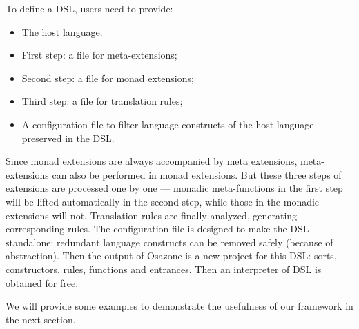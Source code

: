 To define a DSL, users need to provide:
\begin{itemize}
  \item The host language.
  \item First step: a file for meta-extensions;
  \item Second step: a file for monad extensions;
  \item Third step: a file for translation rules;
  \item A configuration file to filter language constructs of the host language preserved in the DSL.
\end{itemize}
Since monad extensions are always accompanied by meta extensions,
 meta-extensions can also be performed in monad extensions.
But these three steps of extensions are processed one by one ---
 monadic meta-functions in the first step will be lifted automatically in the second step,
 while those in the monadic extensions will not.
Translation rules are finally analyzed, generating corresponding rules.
The configuration file is designed to make the DSL standalone:
 redundant language constructs can be removed safely (because of abstraction).
Then the output of Osazone is a new project for this DSL: sorts, constructors, rules, functions and entrances.
Then an interpreter of DSL is obtained for free.

We will provide some examples to demonstrate the usefulness of our framework in the next section.

